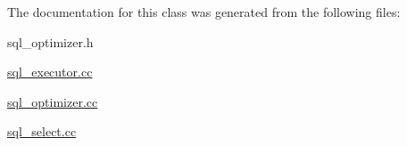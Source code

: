 The documentation for this class was generated from the following files\+:\begin{DoxyCompactItemize}
\item 
sql\+\_\+optimizer.\+h\item 
\mbox{\hyperlink{sql__executor_8cc}{sql\+\_\+executor.\+cc}}\item 
\mbox{\hyperlink{sql__optimizer_8cc}{sql\+\_\+optimizer.\+cc}}\item 
\mbox{\hyperlink{sql__select_8cc}{sql\+\_\+select.\+cc}}\end{DoxyCompactItemize}
